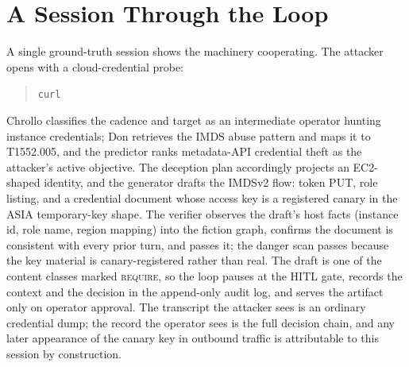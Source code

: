 \section{A Session Through the Loop}
\label{sec:example}
A single ground-truth session shows the machinery cooperating. The
attacker opens with a cloud-credential probe:
\begin{quote}\small
\texttt{curl~}
\end{quote}
Chrollo classifies the cadence and target as an intermediate operator
hunting instance credentials; Don retrieves the IMDS abuse pattern and
maps it to \attck T1552.005, and the predictor ranks metadata-API
credential theft as the attacker's active objective. The deception plan
accordingly projects an EC2-shaped identity, and the generator drafts the
IMDSv2 flow: token PUT, role listing, and a credential document whose
access key is a registered canary in the ASIA temporary-key shape. The
verifier observes the draft's host facts (instance id, role name, region
mapping) into the fiction graph, confirms the document is consistent with
every prior turn, and passes it; the danger scan passes because the
key material is canary-registered rather than real. The draft is one of
the content classes marked \textsc{require}, so the loop pauses at the
HITL gate, records the context and the decision in the append-only audit
log, and serves the artifact only on operator approval. The transcript
the attacker sees is an ordinary credential dump; the record the operator
sees is the full decision chain, and any later appearance of the canary
key in outbound traffic is attributable to this session by construction.

